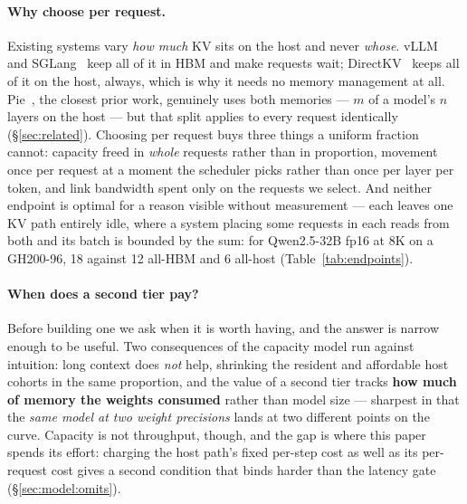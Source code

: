 \paragraph{Why choose per request.} Existing systems vary \emph{how much} KV sits on
the host and never \emph{whose}. vLLM~\cite{vllm} and SGLang~\cite{sglang} keep all
of it in HBM and make requests wait; DirectKV~\cite{directkv} keeps all of it on the
host, always, which is why it needs no memory management at all. Pie~\cite{pie}, the
closest prior work, genuinely uses both memories --- $m$ of a model's $n$ layers on
the host --- but that split applies to every request identically
(\S\ref{sec:related}). Choosing per request buys three things a uniform fraction
cannot: capacity freed in \emph{whole} requests rather than in proportion, movement
once per request at a moment the scheduler picks rather than once per layer per
token, and link bandwidth spent only on the requests we select. And neither endpoint
is optimal for a reason visible without measurement --- each leaves one KV path
entirely idle, where a system placing some requests in each reads from both and its
batch is bounded by the sum: for Qwen2.5-32B fp16 at 8K on a GH200-96, 18 against 12
all-HBM and 6 all-host (Table~\ref{tab:endpoints}).

\paragraph{When does a second tier pay?} Before building one we ask when it is
worth having, and the answer is narrow enough to be useful. Two consequences of the
capacity model run against intuition: long context does \emph{not} help, shrinking
the resident and affordable host cohorts in the same proportion, and the value of a
second tier tracks \textbf{how much of memory the weights consumed} rather than
model size --- sharpest in that the \emph{same model at two weight precisions} lands
at two different points on the curve. Capacity is not throughput, though, and the
gap is where this paper spends its effort: charging the host path's fixed per-step
cost as well as its per-request cost gives a second condition that binds harder than
the latency gate (\S\ref{sec:model:omits}).

